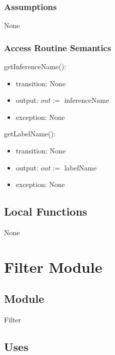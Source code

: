 \documentclass[12pt, titlepage]{article}
\begin{document}
\subsubsection* {Assumptions}

None

\subsubsection* {Access Routine Semantics}

\noindent getInferenceName():
\begin{itemize}
\item transition: None\\
\item output: $out := $ inferenceName\\
\item exception: None\\

\end{itemize}

\noindent getLabelName():
\begin{itemize}
\item transition: None\\
\item output: $out := $ labelName\\
\item exception: None\\

\end{itemize}

\subsection*{Local Functions}

None

\medskip
\medskip


\newpage

\section* {Filter Module}

\subsection*{Module}

Filter

\subsection* {Uses}
\end{document}
